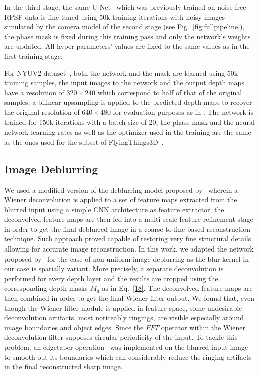 \documentclass[preprint,5p,twocolumn]{elsarticle}
\begin{document}
In the third stage, the same U-Net~\cite{ronneberger2015u} which was previously trained on noise-free RPSF data is fine-tuned using 50k training iterations with noisy images simulated by the camera model of the second stage (see Fig.~\ref{fig:fullpipeline}), the phase mask is fixed during this training pass and only the network's weights are updated. All hyper-parameters' values are fixed to the same values as in the first training stage.

For NYUV2 dataset~\cite{eigen2014depth}, both the network and the mask are learned  using 50k training samples, the input images to the network and the output depth maps have a resolution of $320\times240$ which correspond to half of that of the original samples, a bilinear-upsampling is applied to the predicted depth maps to recover the original resolution of $640\times480$ for evaluation purposes as in \cite{bhat2020adabins, chen2019structure,hao2018detail}. The network is trained for 150k iterations with a batch size of 20, the phase mask and  the neural network learning rates as well as the optimizer used in the training are the same as the ones used for the subset of FlyingThings3D~\cite{MIFDB16}.

\subsection{Image Deblurring}
\label{subsec:image_deblurring}


We used a modified version of the deblurring model proposed by~\cite{dong2021deep} wherein a Wiener deconvolution is applied to a set of feature maps extracted from the blurred input using a simple CNN architecture as feature extractor, the deconvolved feature maps are then fed into a multi-scale feature refinement stage in order to get the final deblurred image in a coarse-to-fine based reconstruction technique. Such approach proved capable of restoring very fine structural details allowing for accurate image reconstruction. In this work, we adapted the network proposed by~\cite{dong2021deep} for the case of non-uniform image deblurring as the blur kernel in our case is spatially variant. More precisely, a separate deconvolution is performed for every depth layer and the results are cropped using the corresponding depth masks $M_{d}$ as in Eq.~\ref{18}. The deconvolved feature maps are then combined in order to get the final Wiener filter output. We found that, even though the Wiener filter module is applied in feature space, some undesirable deconvolution artifacts, most noticeably ringings, are visible especially around image boundaries and object edges. Since the $FFT$ operator within the Wiener deconvolution filter supposes circular periodicity of the input. To tackle this problem, an edgetaper operation~\cite{reeves2005fast} was implemented on the blurred input image to smooth out its boundaries which can considerably reduce the ringing artifacts in the final reconstructed sharp image. 
\end{document}
